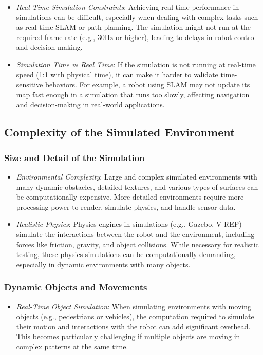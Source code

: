 \documentclass[../../main]{subfiles}
\begin{document}
    \begin{itemize}
    \item
      \emph{Real-Time Simulation Constraints}: Achieving real-time
      performance in simulations can be difficult, especially when dealing
      with complex tasks such as real-time SLAM or path planning. The
      simulation might not run at the required frame rate (e.g., 30Hz or
      higher), leading to delays in robot control and decision-making.
    \item
      \emph{Simulation Time vs Real Time}: If the simulation is not
      running at real-time speed (1:1 with physical time), it can make it
      harder to validate time-sensitive behaviors. For example, a robot
      using SLAM may not update its map fast enough in a simulation that
      runs too slowly, affecting navigation and decision-making in
      real-world applications.
    \end{itemize}
    
    \subsection{Complexity of the Simulated Environment}

    \subsubsection{Size and Detail of the Simulation}    
    \begin{itemize}
    \item
      \emph{Environmental Complexity}: Large and complex simulated
      environments with many dynamic obstacles, detailed textures, and
      various types of surfaces can be computationally expensive. More
      detailed environments require more processing power to render,
      simulate physics, and handle sensor data.
    \item
      \emph{Realistic Physics}: Physics engines in simulations (e.g.,
      Gazebo, V-REP) simulate the interactions between the robot and the
      environment, including forces like friction, gravity, and object
      collisions. While necessary for realistic testing, these physics
      simulations can be computationally demanding, especially in dynamic
      environments with many objects.
    \end{itemize}
    
    \subsubsection{Dynamic Objects and Movements}    
    \begin{itemize}
    \item
      \emph{Real-Time Object Simulation}: When simulating environments
      with moving objects (e.g., pedestrians or vehicles), the computation
      required to simulate their motion and interactions with the robot can
      add significant overhead. This becomes particularly challenging if
      multiple objects are moving in complex patterns at the same time.
    \end{itemize}
    
\end{document}
